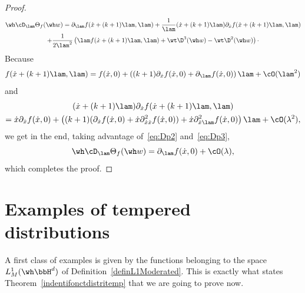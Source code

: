 \begin{proof}
\begin{multline}
\wh\cD_\lam\Theta_f(\wh w)= \partial_\lam f(\dot x+(k+1)\lam,\lam)+
\frac1{\lam}(\dot x+(k+1)\lam)\partial_{\dot x}f(\dot x+(k+1)\lam,\lam) \\
+\frac1{2\lam^2}\left(\lam f(\dot x+(k+1)\lam,\lam) +\wt\D^3(\wh w)-\wt\D^2(\wh w)\right)\cdotp
\end{multline}
Because
\[
f(\dot x+(k+1)\lam,\lam) = f(\dot x,0)+\left((k+1)\partial_{\dot x}f(\dot x,0)+\partial_\lam f(\dot x,0)\right)\lam+\cO(\lam^2)
\]
and
\begin{multline*}
(\dot x+(k+1)\lam)\partial_{\dot x}f(\dot x+(k+1)\lam,\lam)\\
=\dot x\partial_{\dot x}f(\dot x,0)+\left((k+1)(\partial_{\dot x}f(\dot x,0)+\dot x\partial^2_{\dot x\dot x} f(\dot x,0))+\dot x\partial^2_{\dot x\lam} f(\dot x,0)\right)\lam+\cO(\lambda^2),
\end{multline*}
we get in the end, taking advantage of~\eqref{eq:Dp2} and~\eqref{eq:Dp3},
\[
\wh\cD_\lam\Theta_f(\wh w)= \partial_\lam f(\dot x,0)+\cO(\lambda),
\]
which completes the proof.
\end{proof}


\section{Examples of tempered distributions}\label{examplescS'}

A first class of examples is given by the functions belonging to the space~$L^1_M(\wh\bbH^d)$ of Definition~\ref{definL1Moderated}. This is exactly what states Theorem~\ref{indentifonctdistritemp} that we are going to prove now.

